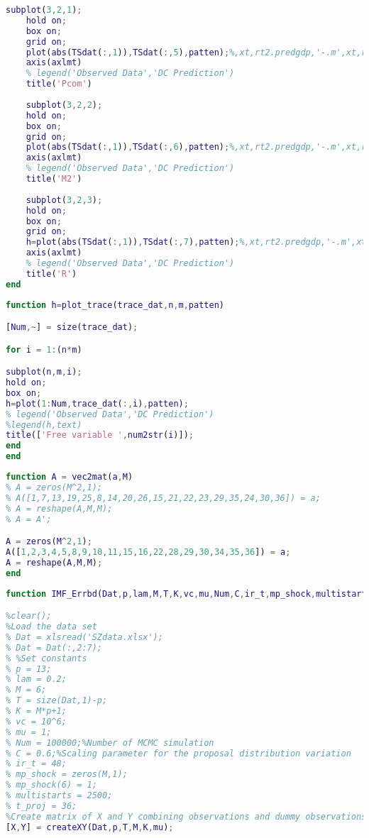 \documentclass[11pt, oneside]{article}   	%
\begin{document}
\begin{appendices}
\begin{lstlisting}[language=Matlab ,caption={\textit{plot\textunderscore all\textunderscore TS} plots impulse response functions (w.r.t $t$) into subplots.}, label={code:plot_all_TS}]
    subplot(3,2,1);
    hold on;
    box on;
    grid on;
    plot(abs(TSdat(:,1)),TSdat(:,5),patten);%,xt,rt2.predgdp,'-.m',xt,rt3.predgdp,'--c',xt,rt4.predgdp,':r')
    axis(axlmt)
    % legend('Observed Data','DC Prediction')
    title('Pcom')
    
    subplot(3,2,2);
    hold on;
    box on;
    grid on;
    plot(abs(TSdat(:,1)),TSdat(:,6),patten);%,xt,rt2.predgdp,'-.m',xt,rt3.predgdp,'--c',xt,rt4.predgdp,':r')
    axis(axlmt)
    % legend('Observed Data','DC Prediction')
    title('M2')
    
    subplot(3,2,3);
    hold on;
    box on;
    grid on;
    h=plot(abs(TSdat(:,1)),TSdat(:,7),patten);%,xt,rt2.predgdp,'-.m',xt,rt3.predgdp,'--c',xt,rt4.predgdp,':r')
    axis(axlmt)
    % legend('Observed Data','DC Prediction')
    title('R')
end
\end{lstlisting}

\begin{lstlisting}[language=Matlab ,caption={\textit{plot\textunderscore trace.m} plots trace plots of free variables in vector $a_0$.}, label={code:plot_trace}]
function h=plot_trace(trace_dat,n,m,patten)

[Num,~] = size(trace_dat);

for i = 1:(n*m)

subplot(n,m,i);
hold on;
box on;
h=plot(1:Num,trace_dat(:,i),patten);
% legend('Observed Data','DC Prediction')
%legend(h,text)
title(['Free variable ',num2str(i)]);
end
end
\end{lstlisting}

\begin{lstlisting}[language=Matlab ,caption={\textit{vec2mat.m} transfers the free variables in $A_0$ into a vector $a_0$.}, label={code:vec2mat}]
function A = vec2mat(a,M)
% A = zeros(M^2,1);
% A([1,7,13,19,25,8,14,20,26,15,21,22,23,29,35,24,30,36]) = a;
% A = reshape(A,M,M);
% A = A';

A = zeros(M^2,1);
A([1,2,3,4,5,8,9,10,11,15,16,22,28,29,30,34,35,36]) = a;
A = reshape(A,M,M);
end
\end{lstlisting}

\begin{lstlisting}[language=Matlab ,caption={\textit{imf\textunderscore var.m} calculates the IMF variance based on shock given.}, label={code:imf_var}]
function IMF_Errbd(Dat,p,lam,M,T,K,vc,mu,Num,C,ir_t,mp_shock,multistarts,t_proj,text)

%clear();
%Load the data set
% Dat = xlsread('SZdata.xlsx');
% Dat = Dat(:,2:7);
% %Set constants
% p = 13;
% lam = 0.2;
% M = 6;
% T = size(Dat,1)-p;
% K = M*p+1;
% vc = 10^6;
% mu = 1;
% Num = 100000;%Number of MCMC simulation
% C = 0.6;%Scaling parameter for the proposal distribution variation
% ir_t = 48;
% mp_shock = zeros(M,1);
% mp_shock(6) = 1;
% multistarts = 2500;
% t_proj = 36;
%Create matrix of X and Y combining observations and dummy observations
[X,Y] = createXY(Dat,p,T,M,K,mu);


\end{lstlisting}
\end{appendices}
\end{document}
